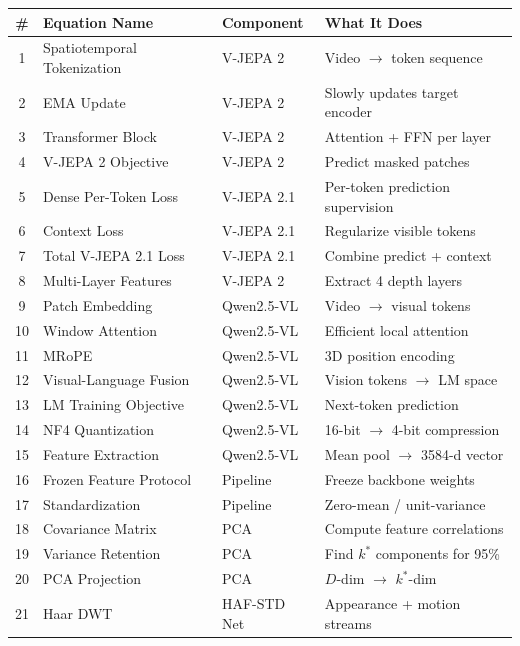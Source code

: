 \documentclass[12pt, a4paper]{article}
\begin{document}
\begin{summarybox}
\renewcommand{\arraystretch}{1.3}
\begin{center}
\small
\begin{tabular}{clll}
\toprule
\textbf{\#} & \textbf{Equation Name} & \textbf{Component} & \textbf{What It Does} \\
\midrule
1 & Spatiotemporal Tokenization & V-JEPA 2 & Video $\rightarrow$ token sequence \\
2 & EMA Update & V-JEPA 2 & Slowly updates target encoder \\
3 & Transformer Block & V-JEPA 2 & Attention + FFN per layer \\
4 & V-JEPA 2 Objective & V-JEPA 2 & Predict masked patches \\
5 & Dense Per-Token Loss & V-JEPA 2.1 & Per-token prediction supervision \\
6 & Context Loss & V-JEPA 2.1 & Regularize visible tokens \\
7 & Total V-JEPA 2.1 Loss & V-JEPA 2.1 & Combine predict + context \\
8 & Multi-Layer Features & V-JEPA 2 & Extract 4 depth layers \\
\midrule
9 & Patch Embedding & Qwen2.5-VL & Video $\rightarrow$ visual tokens \\
10 & Window Attention & Qwen2.5-VL & Efficient local attention \\
11 & MRoPE & Qwen2.5-VL & 3D position encoding \\
12 & Visual-Language Fusion & Qwen2.5-VL & Vision tokens $\rightarrow$ LM space \\
13 & LM Training Objective & Qwen2.5-VL & Next-token prediction \\
14 & NF4 Quantization & Qwen2.5-VL & 16-bit $\rightarrow$ 4-bit compression \\
15 & Feature Extraction & Qwen2.5-VL & Mean pool $\rightarrow$ 3584-d vector \\
\midrule
16 & Frozen Feature Protocol & Pipeline & Freeze backbone weights \\
17 & Standardization & Pipeline & Zero-mean / unit-variance \\
18 & Covariance Matrix & PCA & Compute feature correlations \\
19 & Variance Retention & PCA & Find $k^*$ components for 95\% \\
20 & PCA Projection & PCA & $D$-dim $\rightarrow$ $k^*$-dim \\
\midrule
21 & Haar DWT & HAF-STD Net & Appearance + motion streams \\

\end{tabular}
\end{center}
\end{summarybox}
\end{document}
